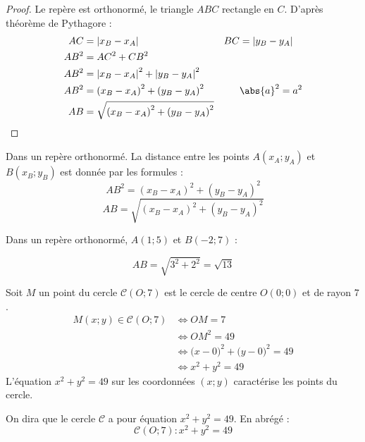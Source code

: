 \begin{proof}
	Le repère est orthonormé, le triangle $ABC$ rectangle en $C$. D'après théorème de Pythagore : 
	\begin{align*}
		AC&=|x_{B}-x_{A}| & 
		BC&=|y_{B}-y_{A}|	\\
		AB^2&= AC^2 + CB^2 \\
		AB^2& = \left|x_{B}-x_{A}\right|^2+\left|y_{B}-y_{A}\right|^2\\
		AB^2& =\left(x_{B}-x_{A}\right)^2+\left(y_{B}-y_{A}\right)^2 &&\text{$\abs{a}^2=a^2$}\\
		AB & =\sqrt{\left(x_{B}-x_{A}\right)^2+\left(y_{B}-y_{A}\right)^2}
	\end{align*} 
\end{proof} 
\begin{theorem} Dans un repère orthonormé. La distance entre les points $A(x_A;y_A)$ et $B(x_B;y_B)$ est donnée par les formules :
	$$AB^2= \left(x_{B}-x_{A}\right)^2+\left(y_{B}-y_{A}\right)^2$$
	$$AB   =\sqrt{\left(x_{B}-x_{A}\right)^2+\left(y_{B}-y_{A}\right)^2}$$
\end{theorem} 
\newpage 
\begin{example}
	Dans un repère orthonormé, $A(1;5)$ et $B(-2;7)$ :
	
	
	$$
	AB=\sqrt{3^2+2^2}=\sqrt{13}
	$$
\end{example}
\begin{example}  Soit $M$ un point du cercle $\mathscr{C}(O;7)$ est le cercle de centre $O(0;0)$ et de rayon $7$. 
	\begin{align*}
		M(x;y)\in \mathscr{C}(O;7) & \iff OM = 7 \\
		& \iff OM^2 = 49\\
		& \iff \big( x - 0 \big)^2 + \big( y - 0 \big)^2 =49 \\
		& \iff x^2 + y^2 =49 
	\end{align*} 
	L'équation $x^2 + y^2 =49$ sur les coordonnées $(x;y)$ caractérise les points du cercle. 
	
	On dira que le cercle $\mathscr{C}$ a pour équation $x^2 + y^2 =49$. En abrégé :
	\[
	\mathscr{C}(O;7)\colon x^2 + y^2 =49
	\] 
\end{example}
